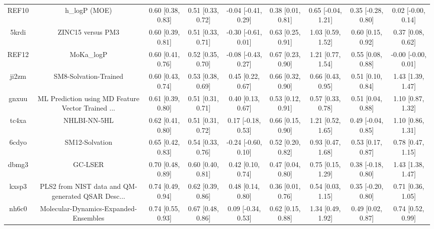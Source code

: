 \documentclass{article}
\begin{document}
\begin{center}
\begin{longtable}{|ccccccccc|}
 REF10 &                                      h\_logP (MOE) &  0.60 [0.38, 0.83] &  0.51 [0.33, 0.72] &   -0.04 [-0.41, 0.29] &  0.38 [0.01, 0.81] &   0.65 [-0.04, 1.21] &   0.35 [-0.28, 0.80] &    0.02 [-0.00, 0.14] \\
 5krdi &                                  ZINC15 versus PM3 &  0.60 [0.39, 0.81] &  0.51 [0.33, 0.71] &   -0.30 [-0.61, 0.01] &  0.63 [0.25, 0.91] &    1.03 [0.59, 1.52] &    0.60 [0.15, 0.92] &     0.37 [0.08, 0.62] \\
 REF12 &                                         MoKa\_logP &  0.60 [0.41, 0.76] &  0.52 [0.35, 0.70] &   -0.08 [-0.43, 0.27] &  0.67 [0.23, 0.90] &    1.21 [0.77, 1.54] &    0.55 [0.08, 0.88] &   -0.00 [-0.00, 0.01] \\
 ji2zm &                              SM8-Solvation-Trained &  0.60 [0.43, 0.74] &  0.53 [0.38, 0.69] &     0.45 [0.22, 0.67] &  0.66 [0.32, 0.90] &    0.66 [0.43, 0.95] &    0.51 [0.10, 0.84] &     1.43 [1.39, 1.47] \\
 gnxuu &  ML Prediction using MD Feature Vector Trained ... &  0.61 [0.39, 0.80] &  0.51 [0.31, 0.71] &     0.40 [0.13, 0.67] &  0.53 [0.12, 0.91] &    0.57 [0.33, 0.78] &    0.51 [0.04, 0.88] &     1.10 [0.87, 1.32] \\
 tc4xa &                                       NHLBI-NN-5HL &  0.62 [0.41, 0.80] &  0.51 [0.31, 0.72] &    0.17 [-0.18, 0.53] &  0.66 [0.15, 0.90] &    1.21 [0.52, 1.65] &   0.49 [-0.04, 0.85] &     1.10 [0.86, 1.31] \\
 6cdyo &                                     SM12-Solvation &  0.65 [0.42, 0.83] &  0.54 [0.33, 0.76] &   -0.24 [-0.60, 0.10] &  0.52 [0.20, 0.82] &    0.93 [0.47, 1.68] &    0.53 [0.17, 0.87] &     0.78 [0.47, 1.15] \\
 dbmg3 &                                            GC-LSER &  0.70 [0.48, 0.89] &  0.60 [0.40, 0.81] &     0.42 [0.10, 0.74] &  0.47 [0.04, 0.80] &    0.75 [0.15, 1.29] &   0.38 [-0.18, 0.80] &     1.43 [1.38, 1.47] \\
 kxsp3 &  PLS2 from NIST data and QM-generated QSAR Desc... &  0.74 [0.49, 0.94] &  0.62 [0.39, 0.86] &     0.48 [0.14, 0.80] &  0.36 [0.01, 0.76] &    0.54 [0.03, 1.15] &   0.35 [-0.20, 0.80] &     0.71 [0.36, 1.05] \\
 nh6c0 &              Molecular-Dynamics-Expanded-Ensembles &  0.74 [0.55, 0.93] &  0.67 [0.48, 0.86] &    0.09 [-0.34, 0.53] &  0.62 [0.15, 0.88] &    1.34 [0.49, 1.92] &    0.49 [0.02, 0.87] &     0.74 [0.52, 0.99] \\

\end{longtable}
\end{center}
\end{document}
